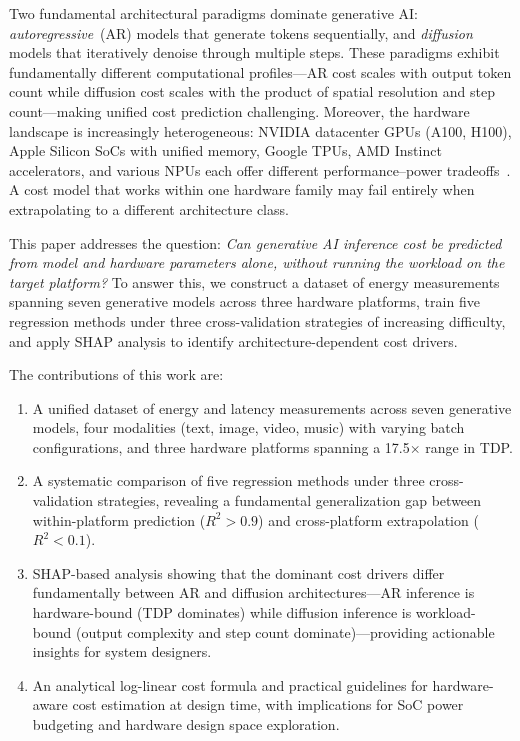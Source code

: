 \documentclass[preprint,review,12pt]{elsarticle}
\begin{document}
Two fundamental architectural paradigms dominate generative AI: \emph{autoregressive}~(AR) models that generate tokens sequentially, and \emph{diffusion} models that iteratively denoise through multiple steps.
These paradigms exhibit fundamentally different computational profiles---AR cost scales with output token count while diffusion cost scales with the product of spatial resolution and step count---making unified cost prediction challenging.
Moreover, the hardware landscape is increasingly heterogeneous: NVIDIA datacenter GPUs (A100, H100), Apple Silicon SoCs with unified memory, Google TPUs, AMD Instinct accelerators, and various NPUs each offer different performance--power tradeoffs~\cite{jouppi2017datacenter}.
A cost model that works within one hardware family may fail entirely when extrapolating to a different architecture class.

This paper addresses the question: \emph{Can generative AI inference cost be predicted from model and hardware parameters alone, without running the workload on the target platform?}
To answer this, we construct a dataset of \unskip{} energy measurements spanning seven generative models across three hardware platforms, train five regression methods under three cross-validation strategies of increasing difficulty, and apply SHAP analysis to identify architecture-dependent cost drivers.

The contributions of this work are:
\begin{enumerate}
\item A unified dataset of \unskip{} energy and latency measurements across seven generative models, four modalities (text, image, video, music) with varying batch configurations, and three hardware platforms spanning a 17.5$\times$ range in TDP.
\item A systematic comparison of five regression methods under three cross-validation strategies, revealing a fundamental generalization gap between within-platform prediction ($R^2 {>} 0.9$) and cross-platform extrapolation ($R^2 {<} 0.1$).
\item SHAP-based analysis showing that the dominant cost drivers differ fundamentally between AR and diffusion architectures---AR inference is hardware-bound (TDP dominates) while diffusion inference is workload-bound (output complexity and step count dominate)---providing actionable insights for system designers.
\item An analytical log-linear cost formula and practical guidelines for hardware-aware cost estimation at design time, with implications for SoC power budgeting and hardware design space exploration.
\end{enumerate}
\end{document}
